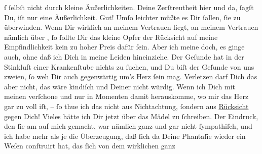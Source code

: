 \begin{ledgroupsized}[t]{13cm}
{                  ſ} ſelbſt nicht durch kleine Äußerlichkeiten. Deine Zerſtreutheit {\pb}hier und da, ſagſt Du, iſt nur eine Äußerlichkeit.
               Gut! Umſo leichter müßte es Dir ſallen, ſie zu überwinden. Wenn Dir wirklich an
               meinem Vertrauen liegt, an meinem Vertrauen nämlich über \label{K_L02651-2v}\label{K_L02651-2h}, ſo ſollte Dir das kleine Opfer der Rücksicht auf meine
               Empfindlichkeit kein zu hoher Preis dafür ſein.\pend
           \pstart
           Aber ich meine doch, es ginge auch, ohne daß ich Dich in meine Leiden hineinziehe.
               Der Geſunde hat in der Stinkluft einer Krankenſtube nichts zu ſuchen, und Du biſt der
               Geſunde von uns zweien, ſo weh Dir auch gegenwärtig um’s Herz ſein mag. Verletzen
               darf Dich das aber nicht, das wäre kindiſch und Deiner nicht würdig. Wenn ich Dich
               mit meinen \label{K_L02651-3v}\label{K_L02651-3h} verſchone und nur in
                  {\pb}Momenten damit herauskomme, wo mir das Herz gar
               zu voll iſt, – ſo thue ich das nicht aus Nichtachtung, ſondern aus \uline{Rücksicht} gegen Dich! {\dotsfive}\pend
           \pstart
           Vieles hätte ich Dir jetzt über das Mädel zu ſchreiben. Der Eindruck, den ſie am \label{K_L02651-4v}\label{K_L02651-4h} auf mich gemacht, war nämlich
               ganz und gar nicht ſympathiſch, und ich habe mehr als je die Überzeugung, daß  ſich da Deine Phantaſie wieder ein Weſen conſtruirt hat, das ſich von dem wirklichen ganz

\end{ledgroupsized}
